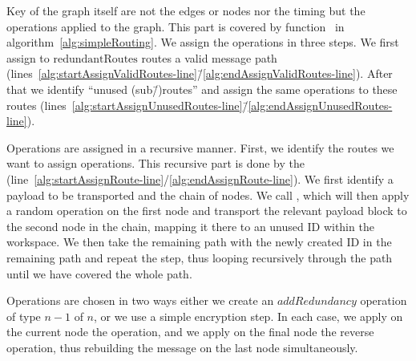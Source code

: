 Key of the graph itself are not the edges or nodes nor the timing but the operations applied to the graph. This part is covered by function~ in algorithm~\ref{alg:simpleRouting}. We assign the operations in three steps. We first assign to $\text{redundantRoutes}$ routes a valid message path (lines~\ref{alg:startAssignValidRoutes-line}\=/\ref{alg:endAssignValidRoutes-line}). After that we identify ``unused (sub\=/)routes'' and assign the same operations to these routes (lines~\ref{alg:startAssignUnusedRoutes-line}\=/\ref{alg:endAssignUnusedRoutes-line}). 

Operations are assigned in a recursive manner. First, we identify the routes we want to assign operations. This recursive part is done by the  (line~\ref{alg:startAssignRoute-line}\-/\ref{alg:endAssignRoute-line}). We first identify a payload to be transported and the chain of nodes. We call , which will then apply a random operation on the first node and transport the relevant payload block to the second node in the chain, mapping it there to an unused ID within the workspace. We then take the remaining path with the newly created ID in the remaining path and repeat the step, thus looping recursively through the path until we have covered the whole path.

Operations are chosen in two ways either we create an $addRedundancy$ operation of type $n-1$ of $n$, or we use a simple encryption step. In each case, we apply on the current node the operation, and we apply on the final node the reverse operation, thus rebuilding the message on the last node simultaneously.

